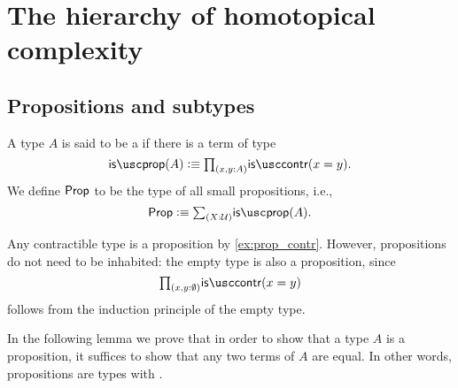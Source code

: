 
\section{The hierarchy of homotopical complexity}
\label{chap:hierarchy}


\subsection{Propositions and subtypes}

\begin{defn}
A type $A$ is said to be a  if there is a term of type
\begin{equation*}
\isprop(A)\defeq\prd{x,y:A}\iscontr(x=y).
\end{equation*}
We define $\mathsf{Prop}$ to be the type of all small propositions, i.e.,
\begin{equation*}
  \prop\defeq\sm{X:\UU}\isprop(A).
\end{equation*}
\end{defn}

\begin{eg}\label{eg:prop_contr}
Any contractible type is a proposition by \cref{ex:prop_contr}. However, propositions do not need to be inhabited: the empty type is also a proposition, since
\begin{equation*}
\prd{x,y:\emptyt}\iscontr(x=y)
\end{equation*}
follows from the induction principle of the empty type.
\end{eg}

In the following lemma we prove that in order to show that a type $A$ is a proposition, it suffices to show that any two terms of $A$ are equal. In other words, propositions are types with .

